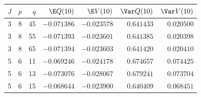\begin{tabular}{rrrrrrr}\toprule
$J$ & $p$ & $q$ & $\E Q(10)$ & $\E V(10)$ & $\Var Q(10)$ & $\Var V(10)$\\\midrule
3 & 8 & 45 & $-0.071386$ & $-0.023578$ & $0.641433$ & $0.020500$\\
3 & 8 & 55 & $-0.071393$ & $-0.023601$ & $0.641385$ & $0.020398$\\
3 & 8 & 65 & $-0.071394$ & $-0.023603$ & $0.641420$ & $0.020410$\\
5 & 6 & 11 & $-0.069246$ & $-0.024178$ & $0.674657$ & $0.074425$\\
5 & 6 & 13 & $-0.073076$ & $-0.028067$ & $0.679241$ & $0.073704$\\
5 & 6 & 15 & $-0.068644$ & $-0.023900$ & $0.640409$ & $0.068451$\\
\bottomrule\end{tabular}
